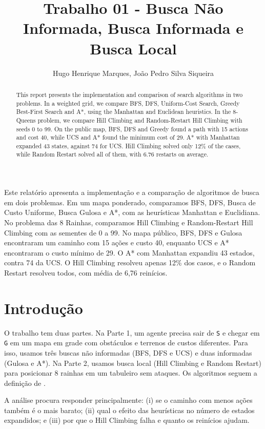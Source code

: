 \documentclass[12pt]{article}
\title{Trabalho 01 - Busca Não Informada, Busca Informada e Busca Local}
\author{Hugo Henrique Marques\inst{1}, João Pedro Silva Siqueira\inst{1}}
\begin{document}
\maketitle

\begin{abstract}
This report presents the implementation and comparison of search algorithms in two problems. In a weighted grid, we compare BFS, DFS, Uniform-Cost Search, Greedy Best-First Search and A*, using the Manhattan and Euclidean heuristics. In the 8-Queens problem, we compare Hill Climbing and Random-Restart Hill Climbing with seeds 0 to 99. On the public map, BFS, DFS and Greedy found a path with 15 actions and cost 40, while UCS and A* found the minimum cost of 29. A* with Manhattan expanded 43 states, against 74 for UCS. Hill Climbing solved only 12\% of the cases, while Random Restart solved all of them, with 6.76 restarts on average.
\end{abstract}

\begin{resumo}
Este relatório apresenta a implementação e a comparação de algoritmos de busca em dois problemas. Em um mapa ponderado, comparamos BFS, DFS, Busca de Custo Uniforme, Busca Gulosa e A*, com as heurísticas Manhattan e Euclidiana. No problema das 8 Rainhas, comparamos Hill Climbing e Random-Restart Hill Climbing com as sementes de 0 a 99. No mapa público, BFS, DFS e Gulosa encontraram um caminho com 15 ações e custo 40, enquanto UCS e A* encontraram o custo mínimo de 29. O A* com Manhattan expandiu 43 estados, contra 74 da UCS. O Hill Climbing resolveu apenas 12\% dos casos, e o Random Restart resolveu todos, com média de 6,76 reinícios.
\end{resumo}

\section{Introdução}
O trabalho tem duas partes. Na Parte 1, um agente precisa sair de \texttt{S} e chegar em \texttt{G} em um mapa em grade com obstáculos e terrenos de custos diferentes. Para isso, usamos três buscas não informadas (BFS, DFS e UCS) e duas informadas (Gulosa e A*). Na Parte 2, usamos busca local (Hill Climbing e Random Restart) para posicionar 8 rainhas em um tabuleiro sem ataques. Os algoritmos seguem a definição de \cite{russell2021}.

A análise procura responder principalmente: (i) se o caminho com menos ações também é o mais barato; (ii) qual o efeito das heurísticas no número de estados expandidos; e (iii) por que o Hill Climbing falha e quanto os reinícios ajudam.
\end{document}
